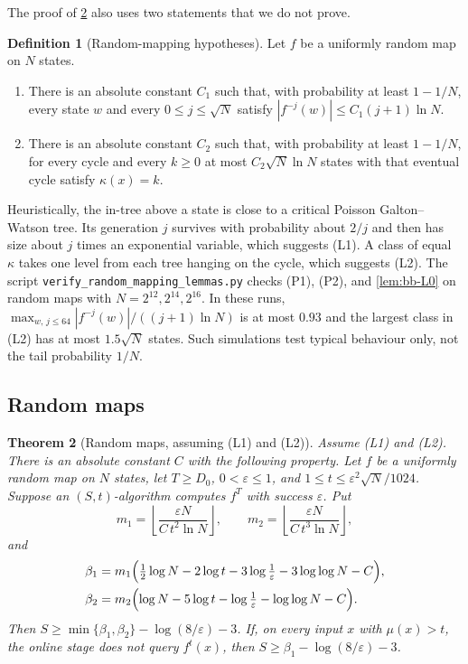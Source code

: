 \documentclass[11pt]{article}
\newtheorem{theorem}{Theorem}[section]
\theoremstyle{definition}
\newtheorem{definition}[theorem]{Definition}
\theoremstyle{remark}
\newcommand{\floor}[1]{\left\lfloor #1\right\rfloor}
\numberwithin{equation}{section}
\begin{document}
The proof of \cref{thm:bb-map} also uses two statements that we do not
prove.

\begin{definition}[Random-mapping hypotheses]\label{def:bb-hyp}
Let $f$ be a uniformly random map on $N$ states.
\begin{enumerate}[label=\textup{(L\arabic*)},start=1]
\item There is an absolute constant $C_1$ such that, with probability at
  least $1-1/N$, every state $w$ and every $0\leq j\leq\sqrt N$ satisfy
  $|f^{-j}(w)|\leq C_1(j+1)\ln N$.
\item There is an absolute constant $C_2$ such that, with probability at
  least $1-1/N$, for every cycle and every $k\geq0$ at most
  $C_2\sqrt N\ln N$ states with that eventual cycle satisfy $\kappa(x)=k$.
\end{enumerate}
\end{definition}

Heuristically, the in-tree above a state is close to a critical Poisson
Galton--Watson tree.  Its generation $j$ survives with probability about
$2/j$ and then has size about $j$ times an exponential variable, which
suggests (L1).  A class of equal $\kappa$ takes one level from each tree
hanging on the cycle, which suggests (L2).  The script
\texttt{verify\_random\_mapping\_lemmas.py} checks (P1), (P2), and
\cref{lem:bb-L0} on random maps with $N=2^{12},2^{14},2^{16}$.  In these
runs, $\max_{w,\,j\leq64}|f^{-j}(w)|/((j+1)\ln N)$ is at most $0.93$ and
the largest class in (L2) has at most $1.5\sqrt N$ states.  Such
simulations test typical behaviour only, not the tail probability
$1/N$.

\subsection{Random maps}

\begin{theorem}[Random maps, assuming (L1) and (L2)]\label{thm:bb-map}
Assume (L1) and (L2).  There is an absolute constant $C$ with the
following property.  Let $f$ be a uniformly random map on $N$ states, let
$T\geq D_0$, $0<\varepsilon\leq1$, and $1\leq t\leq\varepsilon^2\sqrt N/1024$.
Suppose an $(S,t)$-algorithm computes $f^T$ with success $\varepsilon$.
Put
\[
  m_1=\floor{\frac{\varepsilon N}{C\,t^2\ln N}},\qquad
  m_2=\floor{\frac{\varepsilon N}{C\,t^3\ln N}},
\]
and
\begin{align*}
  \beta_1&=m_1\Bigl(\tfrac12\log N-2\log t-3\log\tfrac1\varepsilon
     -3\log\log N-C\Bigr),\\
  \beta_2&=m_2\Bigl(\log N-5\log t-\log\tfrac1\varepsilon
     -\log\log N-C\Bigr).
\end{align*}
Then $S\geq\min\{\beta_1,\beta_2\}-\log(8/\varepsilon)-3$.  If, on every
input $x$ with $\mu(x)>t$, the online stage does not query $f^t(x)$, then
$S\geq\beta_1-\log(8/\varepsilon)-3$.
\end{theorem}
\end{document}
